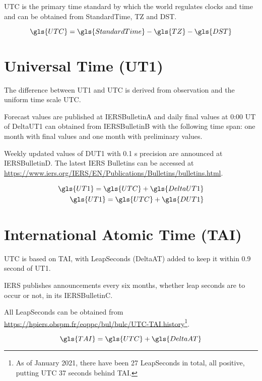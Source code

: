 \documentclass{report}
\begin{document}
\gls{UTC} is the primary time standard by which the world regulates clocks and time and can be obtained from \gls{StandardTime}, \gls{TZ} and \gls{DST}.

\begin{equation}
	\gls{UTC} = \gls{StandardTime} - \gls{TZ} - \gls{DST}	
\end{equation}

\section{Universal Time (UT1)}\label{UT1}

The difference between \gls{UT1} and \gls{UTC} is derived from observation and the uniform time
scale \gls{UTC}. 

Forecast values are published at \gls{IERSBulletinA} and daily final values at 0:00 UT of \gls{DeltaUT1} can obtained from \gls{IERSBulletinB} with the following time span: one month with final values and one month with preliminary values. 

Weekly updated values of \gls{DUT1} with 0.1 s precision are announced at \gls{IERSBulletinD}. The latest \gls{IERS} Bulletins can be accessed at \url{https://www.iers.org/IERS/EN/Publications/Bulletins/bulletins.html}.

\begin{align}
	\gls{UT1} = \gls{UTC} + \gls{DeltaUT1}	\\
	\gls{UT1} = \gls{UTC} + \gls{DUT1}
\end{align}

\section{International Atomic Time (TAI)}\label{TAI}

\gls{UTC} is based on \gls{TAI}, with \glspl{LeapSecond} (\gls{DeltaAT}) added to keep it within 0.9 second of \gls{UT1}. 

\gls{IERS} publishes announcements every six months, whether leap seconds are to occur or not, in its \gls{IERSBulletinC}. 

All \glspl{LeapSecond} can be obtained from \url{https://hpiers.obspm.fr/eoppc/bul/bulc/UTC-TAI.history}\footnote{As of January 2021, there have been 27 \glspl{LeapSecond} in total, all positive, putting \gls{UTC} 37 seconds behind \gls{TAI}.}.

\begin{equation}
	\gls{TAI} = \gls{UTC} + \gls{DeltaAT}
\end{equation}
\end{document}
